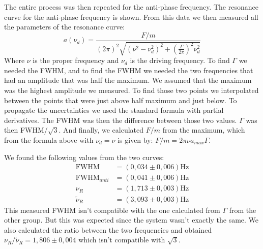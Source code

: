 \documentclass{article}
\begin{document}
The entire process was then repeated for the anti-phase frequency. The resonance curve for the anti-phase frequency is shown. 
From this data we then measured all the parameters of the resonance curve: 
\begin{equation}
    a (\nu_d) = \frac{F/m}{  (2\pi)^2
                \sqrt{( \nu^2 - \nu_d^2 )^2 +
                \left ( \frac{\Gamma}{2\pi} \right )^2 \nu_d^2}}
\end{equation}  
Where $\nu$ is the proper frequency and $\nu_d$ is the driving frequency. To find $\Gamma$ we needed the FWHM, and to find the FWHM we needed the two frequencies that had an amplitude that was half the maximum. We assumed that the maximum was the highest amplitude we measured. To find those two points we interpolated between the points that were just above half maximum and just below. To propagate the uncertainties we used the standard formula with partial derivatives. The FWHM was then the difference between those two values. $\Gamma$ was then FWHM/$\sqrt 3$. And finally, we calculated $F/m$ from the maximum, which from the formula above with $\nu_d = \nu$ is given by: $F/m = 2\pi \nu a_{max} \Gamma$. 

We found the following values from the two curves:
\begin{align}
    \text{FWHM}        &= (0,034 \pm 0,006) \text{Hz}\\
    \text{FWHM}_{anti} &= (0,041 \pm 0,006) \text{Hz}\\
           \nu_R  &= (1,713 \pm 0,003) \text{Hz} \\
    \tilde \nu_R  &= (3,093 \pm 0,003) \text{Hz}
\end{align}
This measured FWHM isn't compatible with the one calculated from $\Gamma$ from the other group. But this was expected since the system wasn't exactly the same.
We also calculated the ratio between the two frequencies and obtained $ \nu_R / \tilde \nu_R = 1,806 \pm 0,004$ which isn't compatible with $\sqrt 3$.

\end{document}
